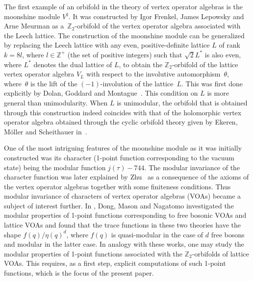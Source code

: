 \documentclass[pdftex]{sigma}
\numberwithin{equation}{section}
\theoremstyle{definition}
\begin{document}
The first example of an orbifold in the theory of vertex operator algebras is the moonshine module $V^{\natural}$. It was constructed by Igor Frenkel, James Lepowsky and Arne Meurman \cite{Frenkel1988VertexMonster} as a~$\mathbb{Z}_2$-orbifold of the vertex operator algebra associated with the Leech lattice. The construction of the moonshine module can be generalized by replacing the Leech lattice with any even, positive-definite lattice $L$ of rank~$k=8l$, where $l\in \mathbb{Z}^+$ (the set of positive integers) such that $\sqrt{2}L^*$ is also even, where $L^*$ denotes the dual lattice of $L$, to obtain the $\mathbb{Z}_2$-orbifold of the lattice vertex operator algebra $V_L$ with respect to the involutive automorphism~$\theta$, where~$\theta$ is the lift of the $(-1)$-involution of the lattice~$L$. This was first done explicitly by Dolan, Goddard and Montague~\cite{Dolan1990ConformalOperators}. This condition on $L$ is more general than unimodularity. When $L$ is unimodular, the orbifold that is obtained through this construction indeed coincides with that of the holomorphic vertex operator algebra obtained through the cyclic orbifold theory given by Ekeren, M{\"o}ller and Scheithauer in~\cite{van2020Construction}.

One of the most intriguing features of the moonshine module as it was initially constructed was its character (1-point function corresponding to the vacuum state) being the modular function $j(\tau)-744$. The modular invariance of the character function was later explained by Zhu~\cite{Zhu1996ModularAlgebras} as a consequence of the axioms of the vertex operator algebras together with some finiteness conditions. Thus modular invariance of characters of vertex operator algebras (VOAs) became a subject of interest further. In \cite{dong2001Quasi}, Dong, Mason and Nagatomo investigated the modular properties of 1-point functions corresponding to free bosonic VOAs and lattice VOAs and found that the trace functions in these two theories have the shape $f(q)/\eta(q)^d$, where $f(q)$ is quasi-modular in the case of $d$ free bosons and modular in the latter case. In analogy with these works, one may study the modular properties of 1-point functions associated with the $\mathbb{Z}_2$-orbifolds of lattice VOAs. This requires, as a first step, explicit computations of such 1-point functions, which is the focus of the present paper.
\end{document}
